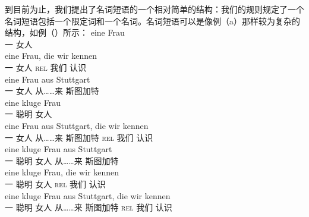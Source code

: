 到目前为止，我们提出了名词短语的一个相对简单的结构：我们的规则规定了一个名词短语包括一个限定词和一个名词。名词短语可以是像例（a）那样较为复杂的结构，如例（）所示：
\addlines
\eal
\label{Beispiele-NP-Adjunkte}
\ex 
\gll eine Frau\\
	 一 女人\\
\ex 
\gll eine Frau, die wir kennen\\
	 一 女人 \textsc{rel} 我们 认识\\
\ex 
\gll eine Frau aus Stuttgart\\
	 一 女人 从……来 斯图加特\\
\ex 
\gll eine kluge Frau\\
	 一 聪明 女人\\
\ex 
\gll eine Frau aus Stuttgart, die wir kennen\\
	 一 女人 从……来 斯图加特 \textsc{rel} 我们 认识\\
\ex 
\gll eine kluge Frau aus Stuttgart\\
	 一 聪明 女人 从……来 斯图加特\\
\ex 
\gll eine kluge Frau, die wir kennen\\
	 一 聪明 女人 \textsc{rel} 我们 认识\\
\ex 
\gll eine kluge Frau aus Stuttgart, die wir kennen\\
	 一 聪明 女人 从……来 斯图加特 \textsc{rel} 我们 认识\\
\zl

